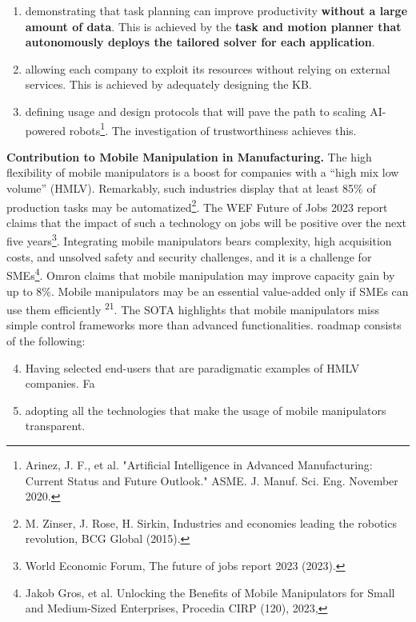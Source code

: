 \begin{enumerate}[action]
\item
  demonstrating that task planning can improve productivity
  \textbf{without a large amount of data}. This is achieved by the
  \textbf{task and motion planner that autonomously deploys the tailored
  solver for each application}.
\item
  allowing each company to exploit its resources without relying on
  external services. This is achieved by adequately designing the KB.
\item
  defining usage and design protocols that will pave the path to scaling
  AI-powered robots\footnote{Arinez, J. F., et al. "Artificial
    Intelligence in Advanced Manufacturing: Current Status and Future
    Outlook." ASME. J. Manuf. Sci. Eng. November 2020.}. The
  investigation of trustworthiness achieves this.
\end{enumerate}


\textbf{Contribution to Mobile Manipulation in Manufacturing.} The high
flexibility of mobile manipulators is a boost for companies with a
``high mix low volume'' (HMLV). Remarkably, such industries display that
at least 85\% of production tasks may be automatized\footnote{M. Zinser,
  J. Rose, H. Sirkin, Industries and economies leading the robotics
  revolution, BCG Global (2015).}. The WEF Future of Jobs 2023 report
claims that the impact of such a technology on jobs will be positive
over the next five years\footnote{World Economic Forum, The future of
  jobs report 2023 (2023).}. Integrating mobile manipulators bears
complexity, high acquisition costs, and unsolved safety and security
challenges, and it is a challenge for SMEs\footnote{Jakob Gros, et al.
  Unlocking the Benefits of Mobile Manipulators for Small and
  Medium-Sized Enterprises, Procedia CIRP (120), 2023,}. Omron claims
that mobile manipulation may improve capacity gain by up to 8\%. Mobile
manipulators may be an essential value-added only if SMEs can use them
efficiently \textsuperscript{21}. The SOTA highlights that mobile
manipulators miss simple control frameworks more than advanced
functionalities.  roadmap consists of the following:

\begin{enumerate}[action]
\setcounter{enumi}{3}
\item
  Having selected end-users that are paradigmatic examples of HMLV
  companies. Fa
\item
  adopting all the technologies that make the usage of mobile
  manipulators transparent.
\end{enumerate}

